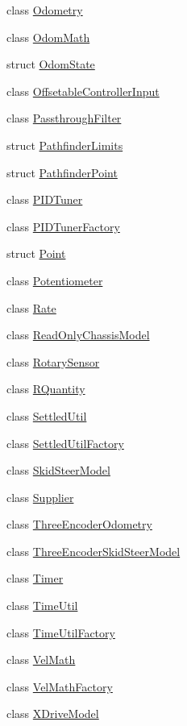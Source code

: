 \begin{DoxyCompactItemize}
class \mbox{\hyperlink{classokapi_1_1Odometry}{Odometry}}
\item 
class \mbox{\hyperlink{classokapi_1_1OdomMath}{Odom\+Math}}
\item 
struct \mbox{\hyperlink{structokapi_1_1OdomState}{Odom\+State}}
\item 
class \mbox{\hyperlink{classokapi_1_1OffsetableControllerInput}{Offsetable\+Controller\+Input}}
\item 
class \mbox{\hyperlink{classokapi_1_1PassthroughFilter}{Passthrough\+Filter}}
\item 
struct \mbox{\hyperlink{structokapi_1_1PathfinderLimits}{Pathfinder\+Limits}}
\item 
struct \mbox{\hyperlink{structokapi_1_1PathfinderPoint}{Pathfinder\+Point}}
\item 
class \mbox{\hyperlink{classokapi_1_1PIDTuner}{P\+I\+D\+Tuner}}
\item 
class \mbox{\hyperlink{classokapi_1_1PIDTunerFactory}{P\+I\+D\+Tuner\+Factory}}
\item 
struct \mbox{\hyperlink{structokapi_1_1Point}{Point}}
\item 
class \mbox{\hyperlink{classokapi_1_1Potentiometer}{Potentiometer}}
\item 
class \mbox{\hyperlink{classokapi_1_1Rate}{Rate}}
\item 
class \mbox{\hyperlink{classokapi_1_1ReadOnlyChassisModel}{Read\+Only\+Chassis\+Model}}
\item 
class \mbox{\hyperlink{classokapi_1_1RotarySensor}{Rotary\+Sensor}}
\item 
class \mbox{\hyperlink{classokapi_1_1RQuantity}{R\+Quantity}}
\item 
class \mbox{\hyperlink{classokapi_1_1SettledUtil}{Settled\+Util}}
\item 
class \mbox{\hyperlink{classokapi_1_1SettledUtilFactory}{Settled\+Util\+Factory}}
\item 
class \mbox{\hyperlink{classokapi_1_1SkidSteerModel}{Skid\+Steer\+Model}}
\item 
class \mbox{\hyperlink{classokapi_1_1Supplier}{Supplier}}
\item 
class \mbox{\hyperlink{classokapi_1_1ThreeEncoderOdometry}{Three\+Encoder\+Odometry}}
\item 
class \mbox{\hyperlink{classokapi_1_1ThreeEncoderSkidSteerModel}{Three\+Encoder\+Skid\+Steer\+Model}}
\item 
class \mbox{\hyperlink{classokapi_1_1Timer}{Timer}}
\item 
class \mbox{\hyperlink{classokapi_1_1TimeUtil}{Time\+Util}}
\item 
class \mbox{\hyperlink{classokapi_1_1TimeUtilFactory}{Time\+Util\+Factory}}
\item 
class \mbox{\hyperlink{classokapi_1_1VelMath}{Vel\+Math}}
\item 
class \mbox{\hyperlink{classokapi_1_1VelMathFactory}{Vel\+Math\+Factory}}
\item 
class \mbox{\hyperlink{classokapi_1_1XDriveModel}{X\+Drive\+Model}}
\end{DoxyCompactItemize}
